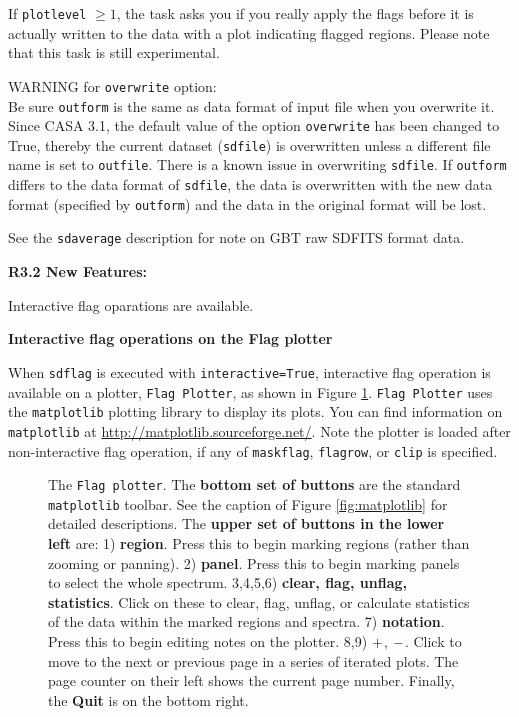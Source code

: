         If {\tt plotlevel} $ \ge 1 $, the task asks you if you really apply the 
        flags before it is actually written to the data with a plot 
        indicating flagged regions.
        Please note that this task is still experimental.

        WARNING for {\tt overwrite} option:\\
        Be sure {\tt outform} is the same as data format of input file when you
        overwrite it. Since CASA 3.1, the default value of the option {\tt overwrite}
        has been changed to True, thereby the current dataset ({\tt sdfile}) is 
        overwritten unless a different file name is set to {\tt outfile}. 
        There is a known issue in overwriting {\tt sdfile}. If {\tt outform} differs to the
        data format of {\tt sdfile}, the data is overwritten with the new data format 
        (specified by {\tt outform}) and the data in the original format will be lost.

    See the {\tt sdaverage} description for note on GBT raw SDFITS format data.


\medskip
{\bf R3.2 New Features:}

Interactive flag oparations are available.

\bigskip
{\bf Interactive flag operations on the Flag plotter}

When {\tt sdflag} is executed with {\tt interactive=True}, 
interactive flag operation is available on a plotter, {\tt Flag Plotter}, 
as shown in Figure \ref{fig:flagplotter}.
{\tt Flag Plotter} uses the {\tt matplotlib} plotting library to display 
its plots. You can find information on {\tt matplotlib} at
\url{http://matplotlib.sourceforge.net/}.
Note the plotter is loaded after non-interactive flag operation, 
if any of {\tt maskflag}, {\tt flagrow}, or {\tt clip} is specified.

\begin{figure}[h!]
\begin{center}
\caption{\label{fig:flagplotter} 
  The {\tt Flag plotter}.
  The {\bf bottom set of buttons} are the standard {\tt matplotlib} toolbar. 
  See the caption of Figure \ref{fig:matplotlib} for detailed descriptions.
  The {\bf upper set of buttons in the lower left} are:
  1) {\bf region}. Press this to begin marking regions (rather than
  zooming or panning).  
  2) {\bf panel}. Press this to begin marking panels to select the whole 
  spectrum.
  3,4,5,6) {\bf clear, flag, unflag, statistics}.  Click on these to clear, 
  flag, unflag, or calculate statistics of the data within the marked 
  regions and spectra.  
  7) {\bf notation}. Press this to begin editing notes on the plotter. 
  8,9) $ {\bf +} $, $ {\bf -} $. Click to move to the next or previous page in a series 
  of iterated plots. The page counter on their left shows the current page 
  number. Finally, the {\bf Quit} is on the bottom right.}
\hrulefill
\end{center}
\end{figure}

